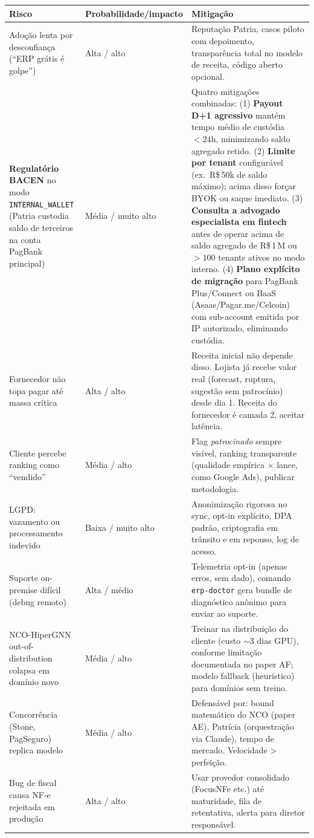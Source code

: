 \documentclass[11pt,a4paper]{article}
\begin{document}
\begin{longtable}{@{}p{4.5cm}p{4.5cm}p{5.5cm}@{}}
\toprule
\textbf{Risco} & \textbf{Probabilidade/impacto} & \textbf{Mitigação} \\
\midrule
\endhead
Adoção lenta por desconfiança (``ERP grátis é golpe'') & Alta / alto &
Reputação Patria, casos piloto com depoimento, transparência total no
modelo de receita, código aberto opcional. \\
\addlinespace
\textbf{Regulatório BACEN} no modo \texttt{INTERNAL\_WALLET} (Patria
custodia saldo de terceiros na conta PagBank principal) & Média / muito
alto &
Quatro mitigações combinadas:
(1) \textbf{Payout D+1 agressivo} mantém tempo médio de custódia
$< 24$h, minimizando saldo agregado retido.
(2) \textbf{Limite por tenant} configurável (ex.\ R\$\,50k de saldo
máximo); acima disso forçar BYOK ou saque imediato.
(3) \textbf{Consulta a advogado especialista em fintech} antes de
operar acima de saldo agregado de R\$\,1\,M ou
$> 100$ tenants ativos no modo interno.
(4) \textbf{Plano explícito de migração} para PagBank Plus/Connect
ou BaaS (Asaas/Pagar.me/Celcoin) com sub-account emitida por IP
autorizado, eliminando custódia. \\
\addlinespace
Fornecedor não topa pagar até massa crítica & Alta / alto &
Receita inicial não depende disso. Lojista já recebe valor real (forecast,
ruptura, sugestão sem patrocínio) desde dia 1. Receita do fornecedor é
camada 2, aceitar latência. \\
\addlinespace
Cliente percebe ranking como ``vendido'' & Média / alto &
Flag \emph{patrocinado} sempre visível, ranking transparente (qualidade
empírica × lance, como Google Ads), publicar metodologia. \\
\addlinespace
LGPD: vazamento ou processamento indevido & Baixa / muito alto &
Anonimização rigorosa no sync, opt-in explícito, DPA padrão, criptografia
em trânsito e em repouso, log de acesso. \\
\addlinespace
Suporte on-premise difícil (debug remoto) & Alta / médio &
Telemetria opt-in (apenas erros, sem dado), comando \texttt{erp-doctor}
gera bundle de diagnóstico anônimo para enviar ao suporte. \\
\addlinespace
NCO-HiperGNN out-of-distribution colapsa em domínio novo & Média / alto &
Treinar na distribuição do cliente (custo $\sim 3$ dias GPU), conforme
limitação documentada no paper AF; modelo fallback (heurístico) para
domínios sem treino. \\
\addlinespace
Concorrência (Stone, PagSeguro) replica modelo & Média / alto &
Defensável por: bound matemático do NCO (paper AE), Patrícia
(orquestração via Claude), tempo de mercado. Velocidade > perfeição. \\
\addlinespace
Bug de fiscal causa NF-e rejeitada em produção & Alta / alto &
Usar provedor consolidado (FocusNFe etc.) até maturidade, fila de
retentativa, alerta para diretor responsável. \\
\bottomrule
\end{longtable}
\end{document}
